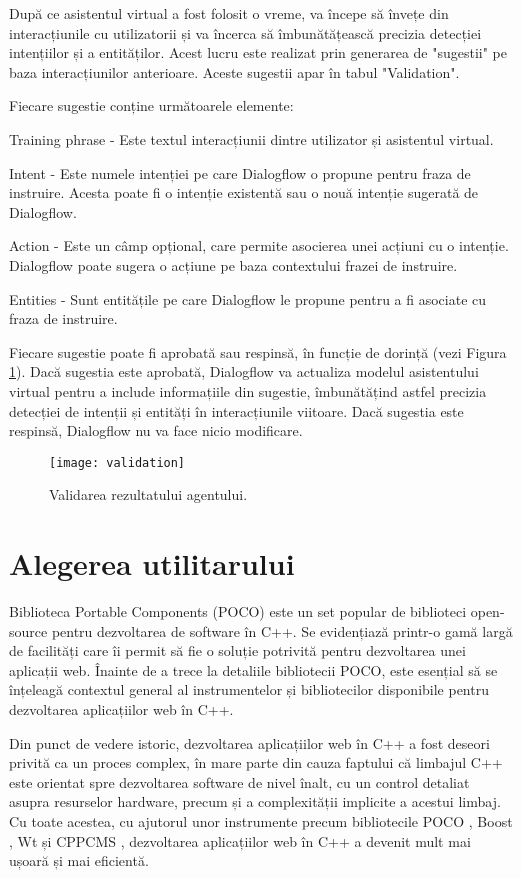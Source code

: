 După ce asistentul virtual a fost folosit o vreme, va începe să învețe din interacțiunile cu utilizatorii și va încerca să îmbunătățească precizia detecției intențiilor și a entităților. Acest lucru este realizat prin generarea de "sugestii" pe baza interacțiunilor anterioare. Aceste sugestii apar în tabul "Validation".

Fiecare sugestie conține următoarele elemente:

Training phrase - Este textul interacțiunii dintre utilizator și asistentul virtual.

Intent - Este numele intenției pe care Dialogflow o propune pentru fraza de instruire. Acesta poate fi o intenție existentă sau o nouă intenție sugerată de Dialogflow.

Action - Este un câmp opțional, care permite asocierea unei acțiuni cu o intenție. Dialogflow poate sugera o acțiune pe baza contextului frazei de instruire.

Entities - Sunt entitățile pe care Dialogflow le propune pentru a fi asociate cu fraza de instruire.

Fiecare sugestie poate fi aprobată sau respinsă, în funcție de dorință (vezi Figura \ref{fig:validation}). Dacă sugestia este aprobată, Dialogflow va actualiza modelul asistentului virtual pentru a include informațiile din sugestie, îmbunătățind astfel precizia detecției de intenții și entități în interacțiunile viitoare. Dacă sugestia este respinsă, Dialogflow nu va face nicio modificare.

\begin{figure}[h]
    \centering
    \texttt{[image: validation]}
    \caption{Validarea rezultatului agentului.}
    \label{fig:validation}
\end{figure}

\section{Alegerea utilitarului}

Biblioteca Portable Components (POCO) este un set popular de biblioteci open-source pentru dezvoltarea de software în C++. Se evidențiază printr-o gamă largă de facilități care îi permit să fie o soluție potrivită pentru dezvoltarea unei aplicații web. Înainte de a trece la detaliile bibliotecii POCO, este esențial să se înțeleagă contextul general al instrumentelor și bibliotecilor disponibile pentru dezvoltarea aplicațiilor web în C++.

Din punct de vedere istoric, dezvoltarea aplicațiilor web în C++ a fost deseori privită ca un proces complex, în mare parte din cauza faptului că limbajul C++ este orientat spre dezvoltarea software de nivel înalt, cu un control detaliat asupra resurselor hardware, precum și a complexității implicite a acestui limbaj. Cu toate acestea, cu ajutorul unor instrumente precum bibliotecile POCO \cite{poco-docs}, Boost \cite{boost-docs}, Wt \cite{wt-docs} și CPPCMS \cite{cppcms-docs}, dezvoltarea aplicațiilor web în C++ a devenit mult mai ușoară și mai eficientă.


